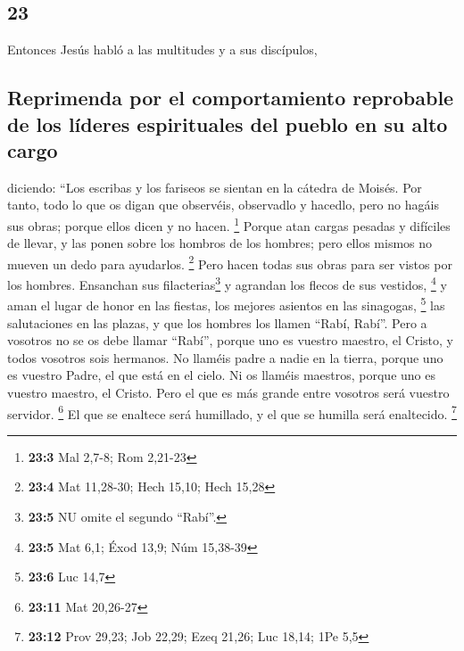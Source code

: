 \begin{paracol}{2}
\hypertarget{section-44}{%
\section{23}\label{section-44}}

 Entonces Jesús habló a las multitudes y a sus discípulos,

\hypertarget{reprimenda-por-el-comportamiento-reprobable-de-los-luxedderes-espirituales-del-pueblo-en-su-alto-cargo}{%
\subsection{Reprimenda por el comportamiento reprobable de los líderes
espirituales del pueblo en su alto
cargo}\label{reprimenda-por-el-comportamiento-reprobable-de-los-luxedderes-espirituales-del-pueblo-en-su-alto-cargo}}

 diciendo: ``Los escribas y los fariseos se sientan en la
cátedra de Moisés.  Por tanto, todo lo que os digan que
observéis, observadlo y hacedlo, pero no hagáis sus obras; porque ellos
dicen y no hacen. \footnote{\textbf{23:3} Mal 2,7-8; Rom 2,21-23}
 Porque atan cargas pesadas y difíciles de llevar, y las
ponen sobre los hombros de los hombres; pero ellos mismos no mueven un
dedo para ayudarlos. \footnote{\textbf{23:4} Mat 11,28-30; Hech 15,10;
  Hech 15,28}  Pero hacen todas sus obras para ser vistos
por los hombres. Ensanchan sus filacterias\footnote{\textbf{23:5} NU
  omite el segundo ``Rabí''.} y agrandan los flecos de sus vestidos,
\footnote{\textbf{23:5} Mat 6,1; Éxod 13,9; Núm 15,38-39} 
y aman el lugar de honor en las fiestas, los mejores asientos en las
sinagogas, \footnote{\textbf{23:6} Luc 14,7}  las
salutaciones en las plazas, y que los hombres los llamen ``Rabí, Rabí''.
 Pero a vosotros no se os debe llamar ``Rabí'', porque uno
es vuestro maestro, el Cristo, y todos vosotros sois hermanos.
 No llaméis padre a nadie en la tierra, porque uno es
vuestro Padre, el que está en el cielo.  Ni os llaméis
maestros, porque uno es vuestro maestro, el Cristo.  Pero
el que es más grande entre vosotros será vuestro servidor. \footnote{\textbf{23:11}
  Mat 20,26-27}  El que se enaltece será humillado, y el
que se humilla será enaltecido. \footnote{\textbf{23:12} Prov 29,23; Job
  22,29; Ezeq 21,26; Luc 18,14; 1Pe 5,5}

\hypertarget{los-siete-ayes-de-los-escribas-y-fariseos}{%
}
\end{paracol}
